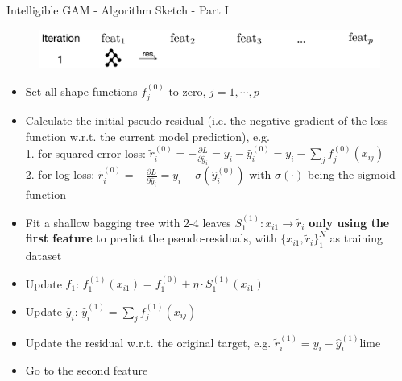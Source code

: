 \documentclass[11pt,compress,t,notes=noshow, aspectratio=169, xcolor=table]{beamer}
\begin{document}
\begin{frame}{Intelligible GAM - Algorithm Sketch - Part I}

\begin{figure}
    \centering
    \includegraphics[width=1\linewidth]{figure/EBM_Step1.png}
    \label{fig:Intelligible EBM_Step1}
\end{figure}
\begin{itemize}
    \item Set all shape functions $f_j^{(0)}$ to zero, $j=1,\cdots,p$
    \item Calculate the initial pseudo-residual (i.e. the negative gradient of the loss function w.r.t. the current model prediction), e.g.\\
    1. for squared error loss: $\tilde{r}_i^{(0)}=-\frac{\partial L}{\partial \hat{y}_i}=y_i-\hat{y}_i^{(0)}=y_i-\sum_jf_j^{(0)}(x_{ij})$\\
    2. for log loss: $\tilde{r}_i^{(0)}=-\frac{\partial L}{\partial \hat{y}_i}=y_i-\sigma(\hat{y}_i^{(0)})$ with $\sigma(\cdot)$ being the sigmoid function
    \item Fit a shallow bagging tree with 2-4 leaves $S_1^{(1)}: x_{i1}\to \tilde{r}_i$ \textbf{only using the first feature} to predict the pseudo-residuals, with $\{x_{i1},\tilde{r}_i\}_1^N$ as training dataset
    \item Update $f_1$: $f_1^{(1)}(x_{i1})=f_1^{(0)}+\eta\cdot S_1^{(1)}(x_{i1})$
    \item Update $\hat{y}_i$: $\hat{y}_i^{(1)}=\sum_jf_j^{(1)}(x_{ij})$
    \item Update the residual w.r.t. the original target, e.g. $\tilde{r}_i^{(1)}=y_i-\hat{y}_i^{(1)}$lime
    \item Go to the second feature
\end{itemize}
\end{frame}
\end{document}
